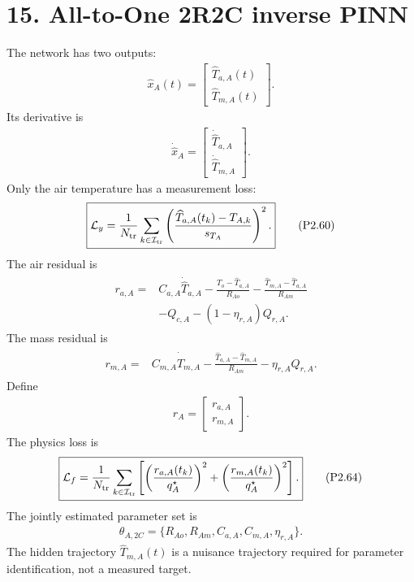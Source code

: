 \documentclass[11pt]{article}
\begin{document}
\section*{15. All-to-One 2R2C inverse PINN}
The network has two outputs:
\begin{align}
\boxed{\widehat x_A(t)=\begin{bmatrix}\widehat T_{a,A}(t)\\\widehat T_{m,A}(t)\end{bmatrix}.}
\tag{P2.58}
\end{align}
Its derivative is
\begin{align}
\boxed{\dot{\widehat x}_A=\begin{bmatrix}\dot{\widehat T}_{a,A}\\\dot{\widehat T}_{m,A}\end{bmatrix}.}
\tag{P2.59}
\end{align}
Only the air temperature has a measurement loss:
\begin{align}
\boxed{\mathcal L_y=\frac{1}{N_{\rm tr}}\sum_{k\in\mathcal I_{\rm tr}}\left(\frac{\widehat T_{a,A}(t_k)-T_{A,k}}{s_{T_A}}\right)^2.}
\tag{P2.60}
\end{align}
The air residual is
\begin{align}
\boxed{\begin{aligned}
r_{a,A}={}&C_{a,A}\dot{\widehat T}_{a,A}-\frac{T_o-\widehat T_{a,A}}{R_{Ao}}-\frac{\widehat T_{m,A}-\widehat T_{a,A}}{R_{Am}}\\
&-Q_{c,A}-(1-\eta_{r,A})Q_{r,A}.
\end{aligned}}
\tag{P2.61}
\end{align}
The mass residual is
\begin{align}
\boxed{\begin{aligned}
r_{m,A}={}&C_{m,A}\dot{\widehat T}_{m,A}-\frac{\widehat T_{a,A}-\widehat T_{m,A}}{R_{Am}}-\eta_{r,A}Q_{r,A}.
\end{aligned}}
\tag{P2.62}
\end{align}
Define
\begin{align}
\boxed{r_A=\begin{bmatrix}r_{a,A}\\r_{m,A}\end{bmatrix}.}
\tag{P2.63}
\end{align}
The physics loss is
\begin{align}
\boxed{\mathcal L_f=\frac{1}{N_{\rm tr}}\sum_{k\in\mathcal I_{\rm tr}}\left[\left(\frac{r_{a,A}(t_k)}{q_A^\star}\right)^2+\left(\frac{r_{m,A}(t_k)}{q_A^\star}\right)^2\right].}
\tag{P2.64}
\end{align}
The jointly estimated parameter set is
\begin{align}
\boxed{\theta_{A,2C}=\{R_{Ao},R_{Am},C_{a,A},C_{m,A},\eta_{r,A}\}.}
\tag{P2.65}
\end{align}
The hidden trajectory \(\widehat T_{m,A}(t)\) is a nuisance trajectory required for parameter identification, not a measured target.
\end{document}
